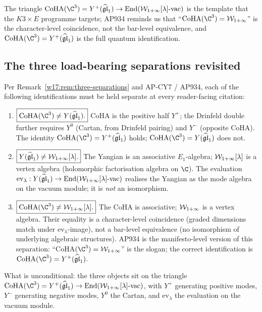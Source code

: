 The triangle $\CoHA(\C^3) = Y^+(\gghone) \to \mathrm{End}
(\Wilpha[\lambda]\text{-vac})$ is the template that the $K3 \times E$
programme targets; AP934 reminds us that ``$\CoHA(\C^3) = \Wilpha$'' is the
character-level coincidence, not the bar-level equivalence, and
$\CoHA(\C^3) = Y^+(\gghone)$ is the full quantum identification.

\subsection{The three load-bearing separations revisited}
\label{w17:subsec:three-separations-final}

Per Remark~\ref{w17:rem:three-separations} and AP-CY7 / AP934, each of the
following identifications must be held separate at every reader-facing citation:
\begin{enumerate}
\item $\boxed{\CoHA(\C^3) \neq Y(\gghone).}$ CoHA is the positive half $Y^+$;
the Drinfeld double further requires $Y^0$ (Cartan, from Drinfeld pairing) and
$Y^-$ (opposite CoHA). The identity $\CoHA(\C^3) = Y^+(\gghone)$ holds;
$\CoHA(\C^3) = Y(\gghone)$ does not.
\item $\boxed{Y(\widehat{\mathfrak{gl}}_1) \neq \mathcal{W}_{1+\infty}[\lambda].}$ The Yangian is an associative
$E_1$-algebra; $\mathcal{W}_{1+\infty}[\lambda]$ is a vertex algebra (holomorphic factorisation
algebra on $\C$). The evaluation $\mathrm{ev}_\lambda: Y(\widehat{\mathfrak{gl}}_1) \to
\mathrm{End}(\mathcal{W}_{1+\infty}[\lambda]\text{-vac})$ realises the Yangian as the mode
algebra on the vacuum module; it is \emph{not} an isomorphism.
\item $\boxed{\CoHA(\C^3) \neq \Wilpha[\lambda].}$ The CoHA is associative;
$\mathcal{W}_{1+\infty}$ is a vertex algebra. Their equality is a character-level
coincidence (graded dimensions match under $\mathrm{ev}_\lambda$-image), not a
bar-level equivalence (no isomorphism of underlying algebraic structures).
AP934 is the manifesto-level version of this separation: ``CoHA$(\C^3) =
\Wilpha$'' is the slogan; the correct identification is $\CoHA(\C^3) =
Y^+(\gghone)$.
\end{enumerate}

What is unconditional: the three objects sit on the triangle
$\CoHA(\C^3) = Y^+(\gghone) \to \mathrm{End}(\Wilpha[\lambda]\text{-vac})$,
with $Y^+$ generating positive modes, $Y^-$ generating negative modes, $Y^0$
the Cartan, and $\mathrm{ev}_\lambda$ the evaluation on the vacuum module.


